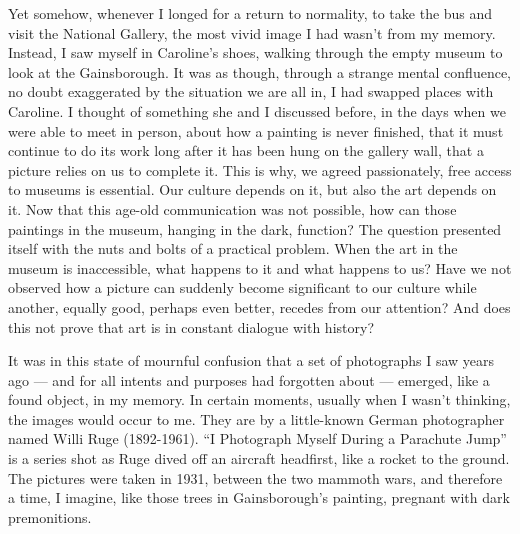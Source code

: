 Yet somehow, whenever I longed for a return to normality, to take the
bus and visit the National Gallery, the most vivid image I had wasn't
from my memory. Instead, I saw myself in Caroline's shoes, walking
through the empty museum to look at the Gainsborough. It was as though,
through a strange mental confluence, no doubt exaggerated by the
situation we are all in, I had swapped places with Caroline. I thought
of something she and I discussed before, in the days when we were able
to meet in person, about how a painting is never finished, that it must
continue to do its work long after it has been hung on the gallery wall,
that a picture relies on us to complete it. This is why, we agreed
passionately, free access to museums is essential. Our culture depends
on it, but also the art depends on it. Now that this age-old
communication was not possible, how can those paintings in the museum,
hanging in the dark, function? The question presented itself with the
nuts and bolts of a practical problem. When the art in the museum is
inaccessible, what happens to it and what happens to us? Have we not
observed how a picture can suddenly become significant to our culture
while another, equally good, perhaps even better, recedes from our
attention? And does this not prove that art is in constant dialogue with
history?

It was in this state of mournful confusion that a set of photographs I
saw years ago --- and for all intents and purposes had forgotten about
--- emerged, like a found object, in my memory. In certain moments,
usually when I wasn't thinking, the images would occur to me. They are
by a little-known German photographer named Willi Ruge (1892-1961). ``I
Photograph Myself During a Parachute Jump'' is a series shot as Ruge
dived off an aircraft headfirst, like a rocket to the ground. The
pictures were taken in 1931, between the two mammoth wars, and therefore
a time, I imagine, like those trees in Gainsborough's painting, pregnant
with dark premonitions.


